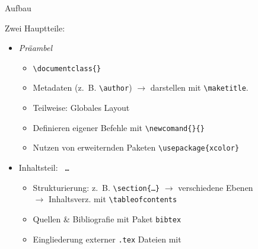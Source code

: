 
\begin{frame}[fragile]{Aufbau}

	Zwei Hauptteile:
	\begin{itemize}[<+-|alert@+>]
		\item \textit{Präambel}
			\begin{itemize}
				\item \verb|\documentclass{}|
				\item Metadaten (z.~B. \verb|\author|) $\rightarrow$ darstellen mit \verb|\maketitle|.
				\item Teilweise: Globales Layout
				\item Definieren eigener Befehle mit \verb|\newcomand{}{}|
				\item Nutzen von erweiternden Paketen \verb|\usepackage{xcolor}|
			\end{itemize}
		\item Inhaltsteil: \verb| … |
			\begin{itemize}
				\item Strukturierung: z.~B. \verb|\section{…}| $\rightarrow$ verschiedene Ebenen \\$\rightarrow$ Inhaltsverz. mit \verb|\tableofcontents|
                \item Quellen \& Bibliografie mit Paket {\color{blue} \texttt{bibtex}}
				\item Eingliederung externer \texttt{.tex} Dateien mit \verb||
			\end{itemize}
	\end{itemize}
\end{frame}
